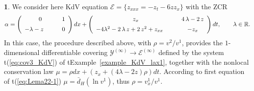 \documentclass[12pt,english]{elsarticle}
\theoremstyle{plain}
\theoremstyle{plain}
\theoremstyle{remark}
\theoremstyle{plain}
\theoremstyle{definition}
\theoremstyle{definition}
\newtheorem{example}[thm]{\protect\examplename}
\providecommand{\examplename}{Example}
\begin{document}
\begin{example}
\label{example_kdv_lax1_cont}%
We consider here KdV equation
$\mathcal{E}=\{z_{xxx}=-z_{t}-6zz_{x}\}$ with the ZCR
%
\begin{equation*}
\alpha =\left (
%
\begin{array}{c@{\quad}c}
0 & 1
\vspace{5pt}
\\
-\lambda -z\qquad & 0
\end{array}
%
\right )dx+\left (
%
\begin{array}{c@{\quad}c}
z_{x} & 4\,\lambda -2\,z
\vspace{5pt}
\\
-4\lambda ^{2}-2\,\lambda \,z+2\,z^{2}+z_{xx}\qquad & -z_{x}
\end{array}
%
\right )dt,\qquad \lambda \in \mathbb{R}.
\end{equation*}
%
In this case, the procedure described above, with
$\rho =v^{2}/v^{1}$, provides the $1$-dimensional differentiable covering
$\mathcal{Y}^{(\infty )}\rightarrow \mathcal{E}^{(\infty )}$ defined by
the system t{(\ref{eq:cov3_KdV})} of t{Example~\ref{example_KdV_lax1}}, together
with the nonlocal conservation law
$\mu =\rho dx+\left (z_{x}+\left (4\lambda -2z\right )\rho \right )dt$.
According to first equation of t{(\ref{eq:Lema22-1})}
$\mu =\bar{d}_{H}(\ln v^{1})$, thus $\rho =v_{x}^{1}/v^{1}$.
\end{example}
\end{document}
